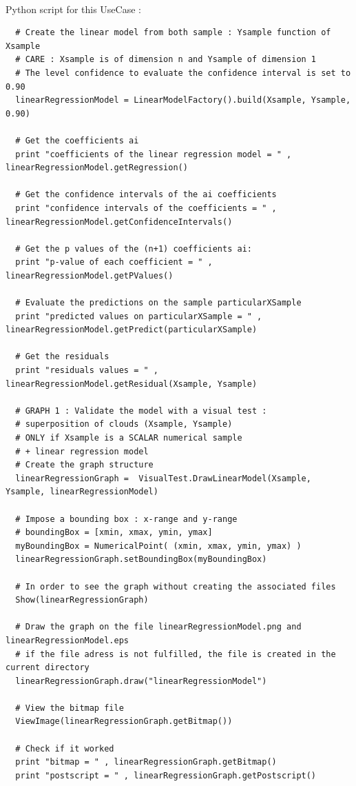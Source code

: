 \textspace\\
Python script for this UseCase :

\begin{lstlisting}
  # Create the linear model from both sample : Ysample function of Xsample
  # CARE : Xsample is of dimension n and Ysample of dimension 1
  # The level confidence to evaluate the confidence interval is set to 0.90
  linearRegressionModel = LinearModelFactory().build(Xsample, Ysample, 0.90)

  # Get the coefficients ai
  print "coefficients of the linear regression model = " , linearRegressionModel.getRegression()

  # Get the confidence intervals of the ai coefficients
  print "confidence intervals of the coefficients = " , linearRegressionModel.getConfidenceIntervals()

  # Get the p values of the (n+1) coefficients ai:
  print "p-value of each coefficient = " , linearRegressionModel.getPValues()

  # Evaluate the predictions on the sample particularXSample
  print "predicted values on particularXSample = " , linearRegressionModel.getPredict(particularXSample)

  # Get the residuals
  print "residuals values = " , linearRegressionModel.getResidual(Xsample, Ysample)

  # GRAPH 1 : Validate the model with a visual test :
  # superposition of clouds (Xsample, Ysample)
  # ONLY if Xsample is a SCALAR numerical sample
  # + linear regression model
  # Create the graph structure
  linearRegressionGraph =  VisualTest.DrawLinearModel(Xsample, Ysample, linearRegressionModel)

  # Impose a bounding box : x-range and y-range
  # boundingBox = [xmin, xmax, ymin, ymax]
  myBoundingBox = NumericalPoint( (xmin, xmax, ymin, ymax) )
  linearRegressionGraph.setBoundingBox(myBoundingBox)

  # In order to see the graph without creating the associated files
  Show(linearRegressionGraph)

  # Draw the graph on the file linearRegressionModel.png and linearRegressionModel.eps
  # if the file adress is not fulfilled, the file is created in the current directory
  linearRegressionGraph.draw("linearRegressionModel")

  # View the bitmap file
  ViewImage(linearRegressionGraph.getBitmap())

  # Check if it worked
  print "bitmap = " , linearRegressionGraph.getBitmap()
  print "postscript = " , linearRegressionGraph.getPostscript()


\end{lstlisting}
